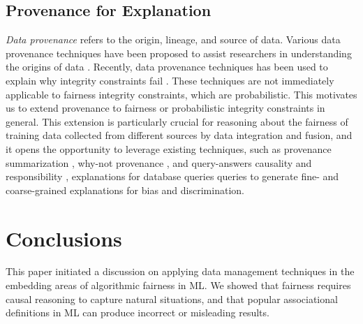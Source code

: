 \documentclass[11pt]{article}
\begin{document}
\subsection{Provenance for Explanation}
\textit{Data provenance} refers to the origin, lineage, and source of data. Various data provenance techniques have been proposed to assist researchers in understanding the origins of data \cite{glavic2007data}. Recently, data provenance techniques has been used to explain why integrity constraints fail \cite{xu2018provenance}. These techniques are not immediately applicable to fairness integrity constraints, which are probabilistic. This motivates us to extend provenance to fairness or probabilistic integrity constraints in general. This extension is particularly 
crucial for reasoning about the fairness of training data collected from different sources by data integration and fusion, and it opens the opportunity to leverage existing techniques, such as provenance summarization
\cite{ainy2015approximated}, why-not provenance \cite{chapman2009not}, and query-answers causality and responsibility \cite{meliou2010complexity, DBLP:conf/icdt/SalimiB15,salimi2016quantifying,bertossi2017causes},  explanations for database queries queries \cite{roy2014formal}  to generate fine- and coarse-grained explanations for bias and discrimination.   
\vspace{-0.3cm}
\section{Conclusions}
This paper initiated a discussion on applying data management techniques in the embedding areas of algorithmic fairness in ML. We showed that fairness requires causal reasoning to capture natural situations, and that popular associational definitions in ML can produce incorrect or misleading results. 

% 
% 

\begin{thebibliography}{10}
\itemsep=1pt
\begin{small}
		

\end{small}
\end{thebibliography} 	
\end{document}

